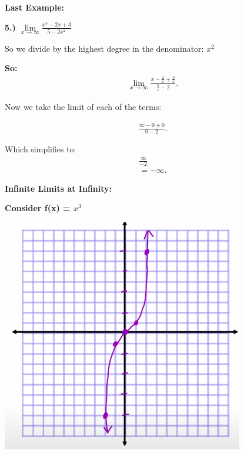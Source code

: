 \documentclass{report}
\begin{document}
        \bigbreak \noindent \bigbreak \noindent 
        \begin{large}
            \textbf{Last Example:}
        \end{large}

        \bigbreak \noindent 
        \textbf{5.) $\lim\limits_{x \to \infty}{ \frac{x^3-2x+3}{5-2x^2}}$}

        \bigbreak \noindent \bigbreak \noindent  
        So we divide by the highest degree in the denominator: \textbf{\textit{$x^2$}}

        \bigbreak \noindent 
        \textbf{So:}
        \begin{align*}
            \lim\limits_{x \to \infty}{ \frac{x - \frac{2}{x} + \frac{3}{x}}{ \frac{5}{x} - 2}}
        .\end{align*}

        \bigbreak \noindent 
        Now we take the limit of each of the terms:

        \begin{align*}
            \frac{ \infty - 0 + 0}{0 - 2}            
        .\end{align*}

        \bigbreak \noindent 
        Which simplifies to:
        \begin{align*}
            \frac{ \infty}{-2} \\ 
            = - \infty
        .\end{align*}

        \pagebreak \bigbreak \noindent
        \begin{large}
            \textbf{Infinite Limits at Infinity:}
        \end{large}

        \bigbreak \noindent  \bigbreak \noindent  \bigbreak \noindent 
        \textbf{Consider f(x) = $x^3$}

        \bigbreak \noindent \bigbreak \noindent 
        \begin{center}
            \includegraphics[scale=0.5]{../images/15.png}
        \end{center}
\end{document}
